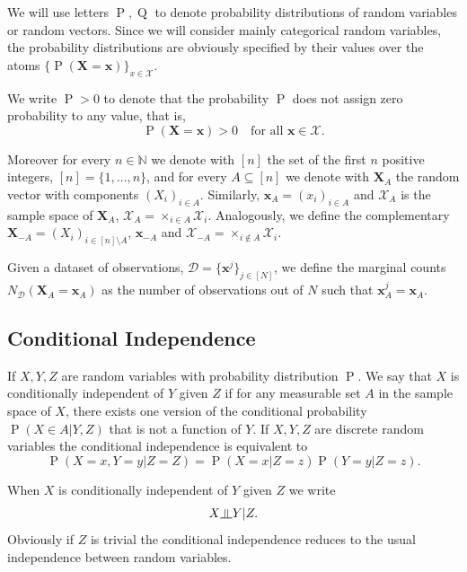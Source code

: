 \documentclass[11pt,a4paper, twoside]{book}
\newcommand{\indep}{\rotatebox[origin=c]{90}{$\models$}}
\newcommand{\Pp}{\operatorname{P}}
\newcommand{\Pq}{\operatorname{Q}}
\newcommand{\bx}{\mathbf{x}}
\newcommand{\bX}{\mathbf{X}}
\newcommand{\bchi}{\boldsymbol{\mathcal{X}}}
\newcommand{\nchi}{\mathcal{X}}
\begin{document}
We will use letters $\Pp, \Pq$ to denote probability distributions of random variables or random vectors.
Since we will consider mainly categorical random variables, the probability distributions are obviously specified by their values over the atoms $\{\Pp(\bX=\bx)\}_{x \in \bchi}$. 

We write $\Pp>0$ to denote that the probability $\Pp$ does not assign zero probability to any value, that is, 
$$\Pp(\bX=\bx)>0 \quad \text{for all } \bx \in \bchi .$$ 


Moreover for every $n \in \mathbb{N}$ we denote with $[n]$ the set of the first $n$ positive integers, $[n]=\{1,\ldots,n\}$, and for every $A\subseteq [n]$ we denote with $\bX_A$ the random vector with components $(X_i)_{i\in A}$. Similarly,  $\bx_A=(x_i)_{i \in A}$ and  $\bchi_A$ is the sample space of $\bX_A$, $\bchi_A=\times_{i\in A}\nchi_i$.
Analogously, we define the complementary $\bX_{-A} = (X_i)_{i \in [n]\setminus A}$, $\bx_{-A}$ and $\bchi_{-A} = \times_{i \notin A}\nchi_i$.


Given a dataset of observations, $\mathcal{D} = \{ \bx^{j} \}_{j\in [N]}$, we define the marginal counts $N_{\mathcal{D}}(\bX_A = \bx_A )$ as the number of observations out of $N$ such that $\bx^{j}_A = \bx_A$.


\subsection{Conditional Independence}


If $X,Y,Z$ are random variables with probability distribution $\Pp$. We say that $X$ is conditionally independent of $Y$ given $Z$ if for any measurable set $A$ in the sample space of $X$, there exists one version of the conditional probability $\Pp(X \in A | Y,Z)$ that is not a function of $Y$. 
If $X,Y,Z$ are discrete random variables the conditional independence is equivalent to
$$ \Pp(X=x, Y=y | Z=Z) = \Pp(X=x|Z=z)\Pp(Y = y| Z=z).$$

When $X$ is conditionally independent of $Y$ given $Z$ we write 
$$ X \indep Y | Z .$$
Obviously if $Z$ is trivial the conditional independence reduces to the usual independence between random variables. 
\end{document}

